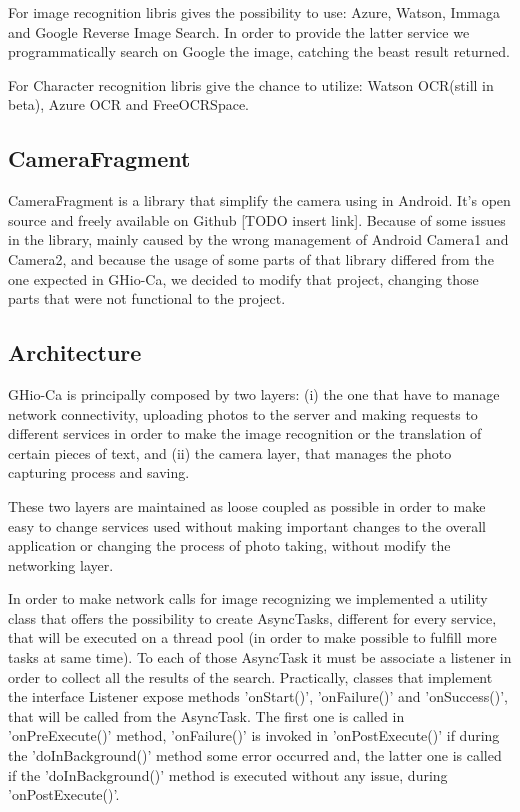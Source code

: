 For image recognition libris gives the possibility to use: Azure, Watson, Immaga 
and Google Reverse Image Search. In order to provide the latter service we 
programmatically search on Google the image, catching the beast result returned.

For Character recognition libris give the chance to utilize: Watson OCR(still in 
beta), Azure OCR and FreeOCRSpace.

\subsection{CameraFragment}
CameraFragment is a library that simplify the camera using in Android. It's 
open source and freely available on Github [TODO insert link]. Because of some
issues in the library, mainly caused by the wrong management of Android Camera1 
and Camera2, and because the usage of some parts of that library differed from 
the one expected in GHio-Ca, we decided to modify that project, changing those 
parts that were not functional to the project.

\subsection{Architecture}
GHio-Ca is principally composed by two layers: (i) the one that have to manage
network connectivity, uploading photos to the server and making requests to 
different services in order to make the image recognition or the translation of 
certain pieces of text, and (ii) the camera layer, that manages the photo 
capturing process and saving. 

These two layers are maintained as loose coupled as possible in order to make 
easy to change services used without making important changes to the overall 
application or changing the process of photo taking, without modify the 
networking layer.

%		

In order to make network calls for image recognizing we implemented a utility 
class that offers the possibility to create AsyncTasks, different for every 
service, that will be executed on a thread pool (in order to make possible to 
fulfill more tasks at same time). To each of those AsyncTask it must be associate 
a listener in order to collect all the results of the search. Practically, 
classes that implement the interface Listener expose methods 'onStart()', 
'onFailure()' and 'onSuccess()', that will be called from the AsyncTask. The 
first one is called in 'onPreExecute()' method, 'onFailure()' is invoked in 
'onPostExecute()' if during the 'doInBackground()' method some error occurred 
and, the latter one is called if the 'doInBackground()' method is executed 
without any issue, during 'onPostExecute()'.

